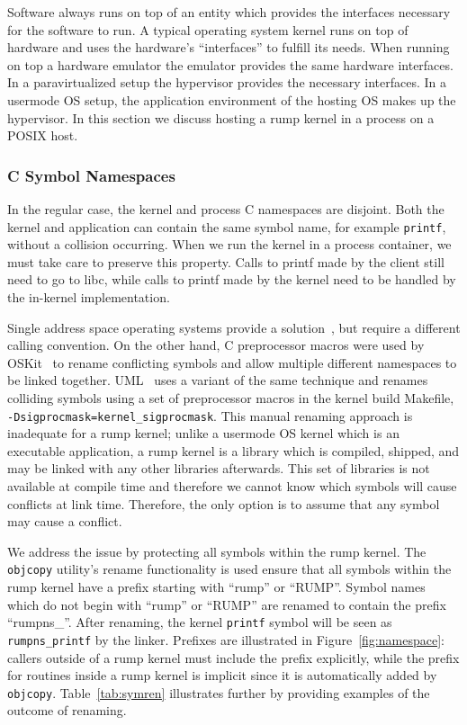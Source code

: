 Software always runs on top of an entity which provides the interfaces
necessary for the software to run.  A typical operating system
kernel runs on top of hardware and uses the hardware's ``interfaces''
to fulfill its needs.  When running on top a hardware emulator the
emulator provides the same hardware interfaces.  In a paravirtualized
setup the hypervisor provides the necessary interfaces.  In a
usermode OS setup, the application environment of the hosting OS
makes up the hypervisor.  In this section we discuss hosting a rump
kernel in a process on a POSIX host.

\subsubsection{C Symbol Namespaces}
\label{chap:rumpns}

In the regular case, the kernel and process C namespaces are disjoint.
Both the kernel and application can contain the same symbol name,
for example \texttt{printf}, without a collision occurring.  When we
run the kernel in a process container, we must take care to preserve
this property.  Calls to printf made by the client still need to go to
libc, while calls to printf made by the kernel need to be handled by
the in-kernel implementation.

Single address space operating systems provide a
solution~\cite{deller:sasoslink}, but require a different calling
convention.  On the other hand, C preprocessor macros were used by
OSKit~\cite{ford:oskit} to rename conflicting symbols and allow multiple
different namespaces to be linked together.  UML~\cite{dike:uml}
uses a variant of the same technique and renames colliding symbols
using a set of preprocessor macros in the kernel build Makefile,
\eg \verb+-Dsigprocmask=kernel_sigprocmask+.  This manual renaming
approach is inadequate for a rump kernel; unlike a usermode OS kernel
which is an executable application, a rump kernel is a library which is
compiled, shipped, and may be linked with any other libraries afterwards.
This set of libraries is not available at compile time and therefore we
cannot know which symbols will cause conflicts at link time.  Therefore,
the only option is to assume that any symbol may cause a conflict.

We address the issue by protecting all symbols within the rump
kernel.  The \texttt{objcopy} utility's rename functionality is
used ensure that all symbols within the rump kernel have a prefix
starting with ``rump'' or ``RUMP''.  Symbol names which do not
begin with ``rump'' or ``RUMP''
are renamed to contain the prefix ``rumpns\_''.  After
renaming, the kernel \texttt{printf} symbol will be seen as
\texttt{rumpns\_printf} by the linker.  Prefixes are illustrated
in Figure~\ref{fig:namespace}: callers outside of a rump kernel
must include the prefix explicitly, while the prefix for routines
inside a rump kernel is implicit since it is automatically added
by \texttt{objcopy}.  Table~\ref{tab:symren} illustrates further
by providing examples of the outcome of renaming.


